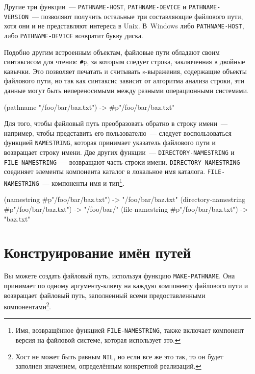Другие три функции~--- \lstinline{PATHNAME-HOST}, \lstinline{PATHNAME-DEVICE} и
\lstinline{PATHNAME-VERSION}~--- позволяют получить остальные три составляющие файлового пути,
хотя они и не представляют интереса в Unix. В~Windows либо \lstinline{PATHNAME-HOST}, либо
\lstinline{PATHNAME-DEVICE} возвратит букву диска.

Подобно другим встроенным объектам, файловые пути обладают своим синтаксисом для чтения:
\lstinline!#p!, за которым следует строка, заключенная в двойные кавычки. Это позволяет
печатать и считывать s-выражения, содержащие объекты файлового пути, но так как синтаксис
зависит от алгоритма анализа строки, эти данные могут быть непереносимыми между разными
операционными системами.

\begin{myverb}
(pathname "/foo/bar/baz.txt") -> #p"/foo/bar/baz.txt" 
\end{myverb}

Для того, чтобы файловый путь преобразовать обратно в строку имени~--- например, чтобы
представить его пользователю~--- следует воспользоваться функцией \lstinline{NAMESTRING},
которая принимает указатель файлового пути и возвращает строку имени. Две других
функции~--- \lstinline{DIRECTORY-NAMESTRING} и \lstinline{FILE-NAMESTRING}~--- возвращают часть
строки имени. \lstinline{DIRECTORY-NAMESTRING} соединяет элементы компонента каталог в
локальное имя каталога. \lstinline{FILE-NAMESTRING}~--- компоненты имя и тип\footnote{Имя,
  возвращённое функцией \lstinline{FILE-NAMESTRING}, также включает компонент версия на
  файловой системе, которая использует это.}\hspace{\footnotenegspace}.

\begin{myverb}
(namestring #p"/foo/bar/baz.txt")           -> "/foo/bar/baz.txt" 
(directory-namestring #p"/foo/bar/baz.txt") -> "/foo/bar/" 
(file-namestring #p"/foo/bar/baz.txt")      -> "baz.txt" 
\end{myverb}

\section{Конструирование имён путей}

Вы можете создать файловый путь, используя функцию \lstinline{MAKE-PATHNAME}. Она принимает по
одному аргументу-ключу на каждую компоненту файлового пути и возвращает файловый путь,
заполненный всеми предоставленными компонентами\footnote{Хост не может быть равным
  \lstinline{NIL}, но если все же это так, то он будет заполнен значением, определённым
  конкретной реализаций.}\hspace{\footnotenegspace}.

